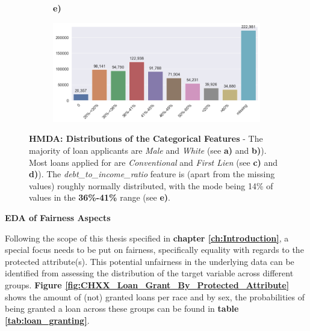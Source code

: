 \begin{figure}[!htbp]
\begin{minipage}[b]{0.5\textwidth}
\begin{subfigure}[t]{0.9\textwidth}
        \end{subfigure}
    \end{minipage}%
    \hfill\allowbreak%
    \begin{minipage}[b]{1\textwidth}
        \centering
        \begin{subfigure}[t]{0.06\textwidth}
            \textbf{e)}
        \end{subfigure}
        \begin{subfigure}[t]{0.92\textwidth}
            \includegraphics[width=\linewidth, valign=t]{images/HMDA_features/HMDA_features_dtir.png}
        \end{subfigure}
    \end{minipage}%

    \caption[HMDA: Distributions of the Categorical Features]{\textbf{HMDA: Distributions of the Categorical Features} - The majority of loan applicants are \textit{Male} and \textit{White} (see \textbf{a)} and \textbf{b)}). 
    Most loans applied for are \textit{Conventional} and \textit{First Lien} (see \textbf{c)} and \textbf{d)}). The \textit{debt\_to\_income\_ratio} feature is (apart from the missing values) roughly normally distributed, with the mode being 14\% of values in the \textbf{36\%-41\%} range (see \textbf{e)}.}
    \label{fig:HMDA_Categorical_Features_Distributions}

\end{figure}


\textbf{EDA of Fairness Aspects}

Following the scope of this thesis specified in \textbf{chapter \ref{ch:Introduction}}, a special focus needs to be put  on fairness, specifically equality with regards to the protected attribute(s).
This potential unfairness in the underlying data can be identified from assessing the distribution of the target variable across different groups.
\textbf{Figure \ref{fig:CHXX_Loan_Grant_By_Protected_Attribute}} shows the amount of (not) granted loans per race and by sex, the probabilities of being granted a loan across these groups can be found in \textbf{table \ref{tab:loan_granting}}.\@


